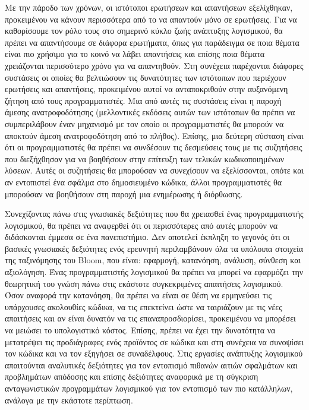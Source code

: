 \documentclass[11pt,a4paper,twoside,english,greek]{article}
\begin{document}
{\setlength{\parindent}{1cm} Με την πάροδο των χρόνων, οι ιστότοποι ερωτήσεων και απαντήσεων εξελίχθηκαν, προκειμένου να κάνουν περισσότερα από το να απαντούν μόνο σε ερωτήσεις. Για να καθορίσουμε τον ρόλο τους στο σημερινό κύκλο ζωής ανάπτυξης λογισμικού, θα πρέπει να απαντήσουμε σε διάφορα ερωτήματα, όπως για παράδειγμα σε ποια θέματα είναι πιο χρήσιμο για το κοινό να λάβει απαντήσεις και επίσης ποια θέματα χρειάζονται περισσότερο χρόνο για να απαντηθούν. Στη συνέχεια παρέχονται διάφορες συστάσεις οι οποίες θα βελτιώσουν τις δυνατότητες των ιστότοπων που περιέχουν ερωτήσεις και απαντήσεις, προκειμένου αυτοί να ανταποκριθούν στην αυξανόμενη ζήτηση από τους προγραμματιστές. Μια από αυτές τις συστάσεις είναι η παροχή άμεσης ανατροφοδότησης (μελλοντικές εκδόσεις αυτών των ιστότοπων θα πρέπει να συμπεριλάβουν έναν μηχανισμό με τον οποίο οι προγραμματιστές θα μπορούν να αποκτούν άμεση ανατροφοδότηση από το πλήθος). Επίσης, μια δεύτερη σύσταση είναι ότι οι προγραμματιστές θα πρέπει να συνδέσουν τις δεσμεύσεις τους με τις συζητήσεις που διεξήχθησαν για να βοηθήσουν στην επίτευξη των τελικών κωδικοποιημένων λύσεων. Αυτές οι συζητήσεις θα μπορούσαν να συνεχίσουν να εξελίσσονται, οπότε και αν εντοπιστεί ένα σφάλμα στο δημοσιευμένο κώδικα, άλλοι προγραμματιστές θα μπορούσαν να βοηθήσουν στη παροχή μια ενημέρωσης ή διόρθωσης.

\setlength{\parindent}{1cm}Συνεχίζοντας πάνω στις γνωσιακές δεξιότητες που θα χρειασθεί ένας προγραμματιστής λογισμικού, θα πρέπει να αναφερθεί ότι οι περισσότερες από αυτές μπορούν να διδάσκονται έμμεσα σε ένα πανεπιστήμιο. Δεν αποτελεί έκπληξη το γεγονός ότι οι βασικές γνωσιακές δεξιότητες ενός ερευνητή περιλαμβάνουν όλα τα υπόλοιπα στοιχεία της ταξινόμησης του Bloom, που είναι: εφαρμογή, κατανόηση, ανάλυση, σύνθεση και αξιολόγηση. Ένας προγραμματιστής λογισμικού θα πρέπει να μπορεί να εφαρμόζει την θεωρητική του γνώση πάνω στις εκάστοτε συγκεκριμένες απαιτήσεις λογισμικού. Όσον αναφορά την κατανόηση, θα πρέπει να είναι σε θέση να ερμηνεύσει τις υπάρχουσες ακολουθίες κώδικα, να τις επεκτείνει ώστε να ταιριάζουν με τις νέες απαιτήσεις και αν είναι δυνατόν να τις επαναπροσδιορίσει, προκειμένου να μπορέσει να μειώσει το υπολογιστικό κόστος. Επίσης, πρέπει να έχει την δυνατότητα να μετατρέψει τις προδιάγραφες ενός προϊόντος σε κώδικα και στη συνέχεια να συνοψίσει τον κώδικα και να τον εξηγήσει σε συναδέλφους. Στις εργασίες ανάπτυξης λογισμικού απαιτούνται αναλυτικές δεξιότητες για τον εντοπισμό πιθανών αιτιών σφαλμάτων και προβλημάτων απόδοσης και επίσης δεξιότητες αναφορικά με τη σύγκριση ανταγωνιστικών προγραμμάτων λογισμικού για τον εντοπισμό των πιο κατάλληλων, ανάλογα με την εκάστοτε περίπτωση.

}
\end{document}
